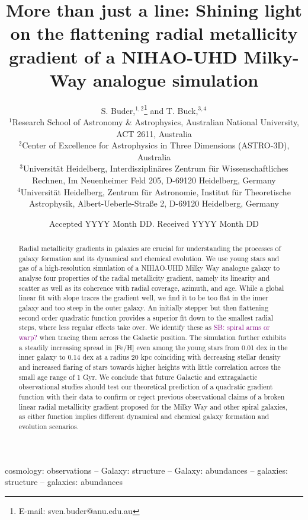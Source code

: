 \documentclass[fleqn,usenatbib]{mnras}
\title[Radial metallicity gradients in NIHAO-UHD]{More than just a line: Shining light on the flattening radial metallicity gradient of a NIHAO-UHD Milky-Way analogue simulation}
\author[S. Buder and T. Buck]{
S. Buder,$^{1,2}$\thanks{E-mail: sven.buder@anu.edu.au} and
T. Buck,$^{3,4}$
\\
$^{1}$Research School of Astronomy \& Astrophysics, Australian National University, ACT 2611, Australia\\
$^{2}$Center of Excellence for Astrophysics in Three Dimensions (ASTRO-3D), Australia\\
$^{3}$Universit{\"a}t Heidelberg, Interdisziplin{\"a}res Zentrum f{\"u}r Wissenschaftliches Rechnen, Im Neuenheimer Feld 205, D-69120 Heidelberg, Germany\\
$^{4}$Universit{\"a}t Heidelberg, Zentrum f{\"u}r Astronomie, Institut f{\"u}r Theoretische Astrophysik, Albert-Ueberle-Straße 2, D-69120 Heidelberg, Germany
}
\date{Accepted YYYY Month DD. Received YYYY Month DD}
\newcommand{\SB}[1]{{\textcolor{purple}{SB: #1}}}
\begin{document}
\label{firstpage}
\pagerange{\pageref{firstpage}--\pageref{lastpage}}
\maketitle

\begin{abstract} %
Radial metallicity gradients in galaxies are crucial for understanding the processes of galaxy formation and its dynamical and chemical evolution.
We use young stars and gas of a high-resolution simulation of a NIHAO-UHD Milky Way analogue galaxy to analyse four properties of the radial metallicity gradient, namely its linearity and scatter as well as its coherence with radial coverage, azimuth, and age.
While a global linear fit with slope traces the gradient well, we find it to be too flat in the inner galaxy and too steep in the outer galaxy. An initially stepper but then flattening second order quadratic function provides a superior fit down to the smallest radial steps, where less regular effects take over. We identify these as \SB{spiral arms or warp?} when tracing them across the Galactic position. The simulation further exhibits a steadily increasing spread in [Fe/H] even among the young stars from 0.01 dex in the inner galaxy to 0.14 dex at a radius 20 kpc coinciding with decreasing stellar density and increased flaring of stars towards higher heights with little correlation across the small age range of 1 Gyr.
We conclude that future Galactic and extragalactic observational studies should test our theoretical prediction of a quadratic gradient function with their data to confirm or reject previous observational claims of a broken linear radial metallicity gradient proposed for the Milky Way and other spiral galaxies, as either function implies different dynamical and chemical galaxy formation and evolution scenarios.
\end{abstract}
\begin{keywords}
cosmology: observations -- Galaxy: structure -- Galaxy: abundances  -- galaxies: structure -- galaxies: abundances
\end{keywords}


\end{document}
